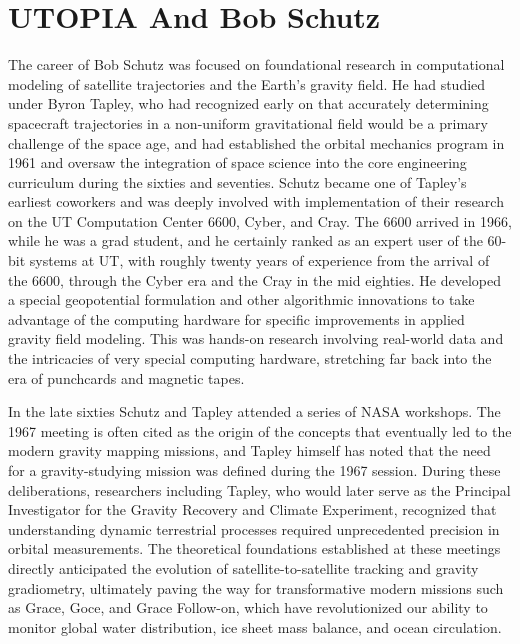 \chapter{UTOPIA And Bob Schutz}

The career of Bob Schutz was focused on foundational research in computational modeling of satellite trajectories and the Earth's gravity field. He had studied under Byron Tapley, who had recognized early on that accurately determining spacecraft trajectories in a non-uniform gravitational field would be a primary challenge of the space age, and had established the orbital mechanics program in 1961 and oversaw the integration of space science into the core engineering curriculum during the sixties and seventies. Schutz became one of Tapley’s earliest coworkers and was deeply involved with implementation of their research on the UT Computation Center 6600, Cyber, and Cray. The 6600 arrived in 1966, while he was a grad student, and he certainly ranked as an expert user of the 60-bit systems at UT, with roughly twenty years of experience from the arrival of the 6600, through the Cyber era and the Cray in the mid eighties. He developed a special geopotential formulation and other algorithmic innovations to take advantage of the computing hardware for specific improvements in applied gravity field modeling. This was hands-on research involving real-world data and the intricacies of very special computing hardware, stretching far back into the era of punchcards and magnetic tapes.

In the late sixties Schutz and Tapley attended a series of NASA workshops. The 1967 meeting is often cited as the origin of the concepts that eventually led to the modern gravity mapping missions, and Tapley himself has noted that the need for a gravity-studying mission was defined during the 1967 session. During these deliberations, researchers including Tapley, who would later serve as the Principal Investigator for the Gravity Recovery and Climate Experiment, recognized that understanding dynamic terrestrial processes required unprecedented precision in orbital measurements. The theoretical foundations established at these meetings directly anticipated the evolution of satellite-to-satellite tracking and gravity gradiometry, ultimately paving the way for transformative modern missions such as Grace, Goce, and Grace Follow-on, which have revolutionized our ability to monitor global water distribution, ice sheet mass balance, and ocean circulation. \cite{nrcUsefulApplicationsEarthoriented1969}

